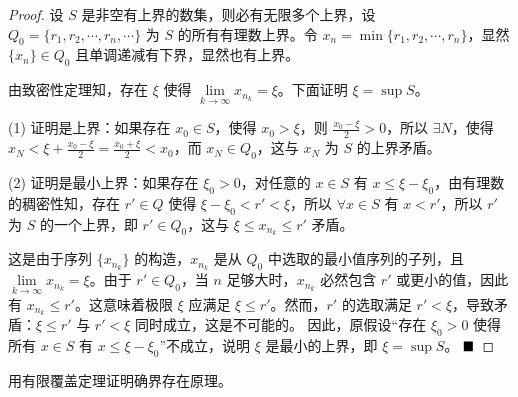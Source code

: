 \begin{proof}
    设 $S$ 是非空有上界的数集，则必有无限多个上界，设 $Q_0 = \{r_1, r_2, \cdots, r_n, \cdots\}$ 为 $S$ 的所有有理数上界。令 $x_n = \min\{r_1, r_2, \cdots, r_n\}$，显然 $\{x_n\} \in Q_0$ 且单调递减有下界，显然也有上界。
    
    由致密性定理知，存在 $\xi$ 使得 $\lim\limits_{k \to \infty} x_{n_k} = \xi$。下面证明 $\xi = \sup S$。
    
    (1) 证明是上界：如果存在 $x_0 \in S$，使得 $x_0 > \xi$，则 $\frac{x_0 - \xi}{2} > 0$，所以 $\exists N$，使得 $x_N < \xi + \frac{x_0 - \xi}{2} = \frac{x_0 + \xi}{2} < x_0$，而 $x_N \in Q_0$，这与 $x_N$ 为 $S$ 的上界矛盾。
    
    (2) 证明是最小上界：如果存在 $\xi_0 > 0$，对任意的 $x \in S$ 有 $x \leq \xi - \xi_0$，由有理数的稠密性知，存在 $r' \in Q$ 使得 $\xi - \xi_0 < r' < \xi$，所以 $\forall x \in S$ 有 $x < r'$，所以 $r'$ 为 $S$ 的一个上界，即 $r' \in Q_0$，这与 $\xi \leq x_{n_k} \leq r'$ 矛盾。
    
    这是由于序列 $\{x_{n_k}\}$ 的构造，$x_{n_k}$ 是从 $Q_0$ 中选取的最小值序列的子列，且 $\lim\limits_{k \to \infty} x_{n_k} = \xi$。由于 $r' \in Q_0$，当 $n$ 足够大时，$x_{n_k}$ 必然包含 $r'$ 或更小的值，因此有 $x_{n_k} \leq r'$。这意味着极限 $\xi$ 应满足 $\xi \leq r'$。然而，$r'$ 的选取满足 $r' < \xi$，导致矛盾：$\xi \leq r'$ 与 $r' < \xi$ 同时成立，这是不可能的。
    因此，原假设“存在 $\xi_0 > 0$ 使得所有 $x \in S$ 有 $x \leq \xi - \xi_0$”不成立，说明 $\xi$ 是最小的上界，即 $\xi = \sup S$。
    $\hfill\blacksquare$
\end{proof}
   
\begin{problem}
    用有限覆盖定理证明确界存在原理。
\end{problem}

